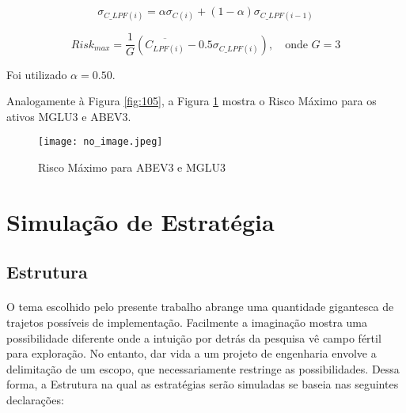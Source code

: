 \begin{itemize}
    \begin{equation} \label{eq:43}
        \sigma_{C\_LPF(i)} = \alpha \sigma_{C(i)} + (1 - \alpha) \sigma_{C\_LPF(i-1)}
    \end{equation}

    \begin{equation} \label{eq:44}
        Risk_{max} = \dfrac{1}{G} (\overline{C_{LPF(i)}} - 0.5\sigma_{C\_LPF(i)}), \quad \textrm{onde } G = 3
    \end{equation}

    Foi utilizado \begin{math} \alpha = 0.50 \end{math}.

    Analogamente à Figura \ref{fig:105}, a Figura \ref{fig:108} mostra o Risco Máximo para os ativos MGLU3 e ABEV3.

    \begin{figure}[h]
        \texttt{[image: no\_image.jpeg]}
        \centering
        \caption{Risco Máximo para ABEV3 e MGLU3}
        \label{fig:108}
    \end{figure}

\end{itemize}



\section{Simulação de Estratégia}

\subsection{Estrutura}

\paragraph{} O tema escolhido pelo presente trabalho abrange uma quantidade gigantesca de trajetos possíveis de implementação. Facilmente a imaginação mostra uma possibilidade diferente onde a intuição por detrás da pesquisa vê campo fértil para exploração. No entanto, dar vida a um projeto de engenharia envolve a delimitação de um escopo, que necessariamente restringe as possibilidades. Dessa forma, a Estrutura na qual as estratégias serão simuladas se baseia nas seguintes declarações:


